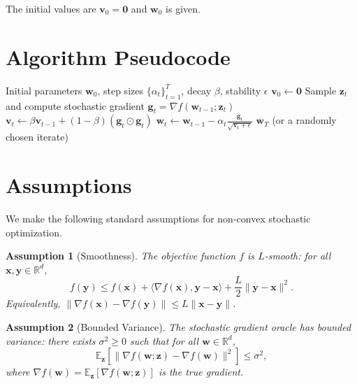 \documentclass{article}
\newcommand{\E}{\mathbb{E}}
\newcommand{\R}{\mathbb{R}}
\newcommand{\norm}[1]{\|#1\|}
\newcommand{\inner}[2]{\langle #1, #2 \rangle}
\newcommand{\grad}{\nabla}
\newcommand{\vect}[1]{\bm{#1}}
\newtheorem{assumption}{Assumption}
\begin{document}
The initial values are \(\vect{v}_0 = \vect{0}\) and \(\vect{w}_0\) is given.

\section*{Algorithm Pseudocode}

\begin{algorithm}[H]
\caption{RMSProp}
\begin{algorithmic}[1]
\Require Initial parameters \(\vect{w}_0\), step sizes \(\{\alpha_t\}_{t=1}^T\), decay \(\beta\), stability \(\epsilon\)
\State \(\vect{v}_0 \gets \vect{0}\)
    \State Sample \(\vect{z}_t\) and compute stochastic gradient \(\vect{g}_t = \grad f(\vect{w}_{t-1}; \vect{z}_t)\)
    \State \(\vect{v}_t \gets \beta \vect{v}_{t-1} + (1-\beta) (\vect{g}_t \odot \vect{g}_t)\)
    \State \(\vect{w}_t \gets \vect{w}_{t-1} - \alpha_t \frac{\vect{g}_t}{\sqrt{\vect{v}_t + \epsilon}}\)
\EndFor
\State \Return \(\vect{w}_T\) (or a randomly chosen iterate)
\end{algorithmic}
\end{algorithm}


\section{Assumptions}

We make the following standard assumptions for non-convex stochastic optimization.

\begin{assumption}[Smoothness] \label{assump:smooth}
The objective function \(f\) is \(L\)-smooth: for all \(\vect{x}, \vect{y} \in \R^d\),
\[
f(\vect{y}) \le f(\vect{x}) + \inner{\grad f(\vect{x})}{\vect{y} - \vect{x}} + \frac{L}{2} \norm{\vect{y} - \vect{x}}^2.
\]
Equivalently, \(\norm{\grad f(\vect{x}) - \grad f(\vect{y})} \le L \norm{\vect{x} - \vect{y}}\).
\end{assumption}

\begin{assumption}[Bounded Variance] \label{assump:variance}
The stochastic gradient oracle has bounded variance: there exists \(\sigma^2 \ge 0\) such that for all \(\vect{w} \in \R^d\),
\[
\E_{\vect{z}} \left[ \norm{\grad f(\vect{w}; \vect{z}) - \grad f(\vect{w})}^2 \right] \le \sigma^2,
\]
where \(\grad f(\vect{w}) = \E_{\vect{z}}[\grad f(\vect{w}; \vect{z})]\) is the true gradient.
\end{assumption}
\end{document}

